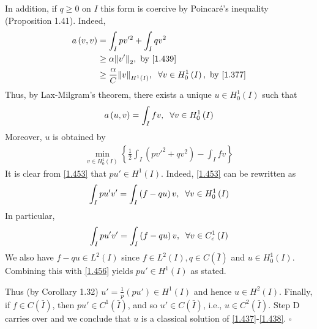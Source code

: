 \documentclass[a4paper,oneside]{article}
\numberwithin{equation}{section}
\begin{document}
In addition, if $q\ge 0$ on $I$ this form is coercive by Poincar\'{e}'s inequality (Proposition 1.41). Indeed, 
\begin{align}
a\left( {v,v} \right) &= \int_I {pv{'^2}}  + \int_I {q{v^2}} \\
& \ge \alpha {\left\| {v'} \right\|_2},\mbox{ by \eqref{1.439}}\\
& \ge \frac{\alpha }{C}{\left\| v \right\|_{{H^1}\left( I \right)}},\hspace{0.2cm}\forall v \in H_0^1\left( I \right),\mbox{ by \eqref{1.377}}
\end{align}
Thus, by Lax-Milgram's theorem, there exists a unique $u\in H_0^1\left(I\right)$ such that
\begin{align}
\label{1.453}
a\left( {u,v} \right) = \int_I {fv} ,\hspace{0.2cm}\forall v \in H_0^1\left( I \right)
\end{align}
Moreover, $u$ is obtained by 
\begin{align}
\mathop {\min }\limits_{v \in H_0^1\left( I \right)} \left\{ {\frac{1}{2}\int_I {\left( {pv{'^2} + q{v^2}} \right)}  - \int_I {fv} } \right\}
\end{align}
It is clear from \eqref{1.453} that $pu'\in H^1\left(I\right)$. Indeed, \eqref{1.453} can be rewritten as
\begin{align}
\int_I {pu'v'}  = \int_I {\left( {f - qu} \right)v} ,\hspace{0.2cm} \forall v \in H_0^1\left( I \right)
\end{align}
In particular, 
\begin{align}
\label{1.456}
\int_I {pu'v'}  = \int_I {\left( {f - qu} \right)v} ,\hspace{0.2cm} \forall v \in C_c^1\left( I \right)
\end{align}
We also have $f-qu\in L^2\left(I\right)$ since $f\in L^2\left(I\right), q\in C\left(\bar I\right)$ and $u\in H_0^1\left(I\right)$. Combining this with \eqref{1.456} yields $pu'\in H^1\left(I\right)$ as stated. 

Thus (by Corollary 1.32) $u' = \frac{1}{p}\left( {pu'} \right) \in {H^1}\left(I\right)$ and hence $u\in H^2\left(I\right)$. Finally, if $f\in C\left(\bar I\right)$, then $pu'\in C^1\left(\bar I\right)$, and so $u'\in C\left(\bar I\right)$, i.e., $u\in C^2\left(\bar I\right)$. Step D carries over and we conclude that $u$ is a classical solution of \eqref{1.437}-\eqref{1.438}. \hfill $\square$\\
\end{document}

